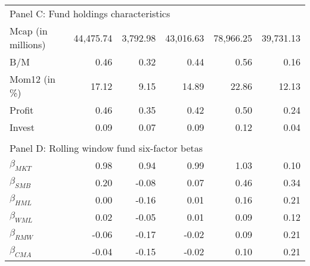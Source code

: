\begin{singlespacing}
\begin{table}[H]
\begin{tabular}{lrrrrr}
                                  \\
\multicolumn{6}{l}{Panel C: Fund holdings characteristics}                                                                                                                                                                                           \\
Mcap (in millions) & 44,475.74 & 3,792.98 & 43,016.63 & 78,966.25 & 39,731.13 \\
B/M                 & 0.46     & 0.32    & 0.44     & 0.56     & 0.16     \\
Mom12  (in \%)      & 17.12    & 9.15    & 14.89    & 22.86    & 12.13    \\
Profit              & 0.46     & 0.35    & 0.42     & 0.50     & 0.24     \\
Invest              & 0.09     & 0.07    & 0.09     & 0.12     & 0.04                                               \\

                                                &          &                                                         &          &      

                                                    &                                                               \\
\multicolumn{6}{l}{Panel D: Rolling window fund six-factor betas}                                                                                                                                                                                                           \\
$\beta_{MKT}$ & 0.98  & 0.94  & 0.99  & 1.03 & 0.10 \\
$\beta_{SMB}$ & 0.20  & -0.08 & 0.07  & 0.46 & 0.34 \\
$\beta_{HML}$ & 0.00  & -0.16 & 0.01  & 0.16 & 0.21 \\
$\beta_{WML}$ & 0.02  & -0.05 & 0.01  & 0.09 & 0.12 \\
$\beta_{RMW}$ & -0.06 & -0.17 & -0.02 & 0.09 & 0.21 \\
$\beta_{CMA}$ & -0.04 & -0.15 & -0.02 & 0.10 & 0.21 \\ \hline
\end{tabular}
\end{table}
\end{singlespacing}

